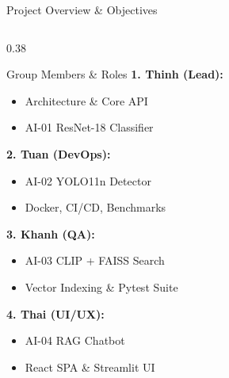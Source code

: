 \documentclass[aspectratio=169, 10pt]{beamer}
\begin{document}
\begin{frame}{Project Overview \& Objectives}
\begin{columns}[T]
    \begin{column}{0.38\textwidth}
      \begin{block}{Group Members \& Roles}
        \small
        \textbf{1. Thinh (Lead):}
        \begin{itemize}
          \item Architecture \& Core API
          \item AI-01 ResNet-18 Classifier
        \end{itemize}
        \textbf{2. Tuan (DevOps):}
        \begin{itemize}
          \item AI-02 YOLO11n Detector
          \item Docker, CI/CD, Benchmarks
        \end{itemize}
        \textbf{3. Khanh (QA):}
        \begin{itemize}
          \item AI-03 CLIP + FAISS Search
          \item Vector Indexing \& Pytest Suite
        \end{itemize}
        \textbf{4. Thai (UI/UX):}
        \begin{itemize}
          \item AI-04 RAG Chatbot
          \item React SPA \& Streamlit UI
        \end{itemize}
      \end{block}
    \end{column}
  \end{columns}
\end{frame}
\end{document}
